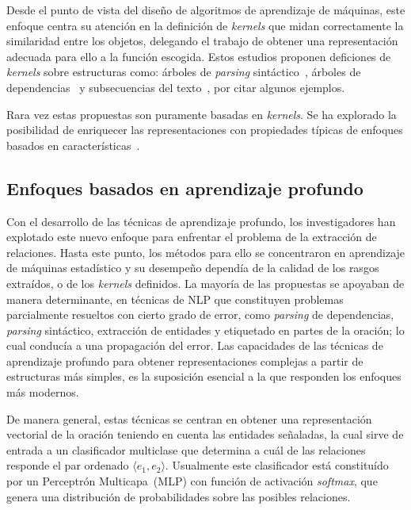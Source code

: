 Desde el punto de vista del diseño de algoritmos de aprendizaje de máquinas, este enfoque centra su atención en la definición de \textit{kernels} que midan correctamente la similaridad entre los objetos, delegando el trabajo de obtener una representación adecuada para ello a la función escogida.
Estos estudios proponen deficiones de \textit{kernels} sobre estructuras como: árboles de \textit{parsing} sintáctico~\cite{zelenko2003kernel, zhao2005extracting, zhang2006composite, zhou2007tree}, árboles de dependencias~\cite{culotta2004dependency, bunescu2005shortest, zhao2005extracting} y subsecuencias del texto~\cite{zhao2005extracting, mooney2006subsequence}, por citar algunos ejemplos.

Rara vez estas propuestas son puramente basadas en \textit{kernels}.
Se ha explorado la posibilidad de enriquecer las representaciones con propiedades típicas de enfoques basados en características~\cite{culotta2004dependency, bunescu2005shortest, zhang2006composite, zhao2005extracting}.

\subsection{Enfoques basados en aprendizaje profundo}

Con el desarrollo de las técnicas de aprendizaje profundo, los investigadores han explotado este nuevo enfoque para enfrentar el problema de la extracción de relaciones.
Hasta este punto, los métodos para ello se concentraron en aprendizaje de máquinas estadístico y su desempeño dependía de la calidad de los rasgos extraídos, o de los \textit{kernels} definidos.
La mayoría de las propuestas se apoyaban de manera determinante, en técnicas de NLP que constituyen problemas parcialmente resueltos con cierto grado de error, como \textit{parsing} de dependencias, \textit{parsing} sintáctico, extracción de entidades y etiquetado en partes de la oración; lo cual conducía a una propagación del error.
Las capacidades de las técnicas de aprendizaje profundo para obtener representaciones complejas a partir de estructuras más simples, es la suposición esencial a la que responden los enfoques más modernos.

De manera general, estas técnicas se centran en obtener una representación vectorial de la oración teniendo en cuenta las entidades señaladas, la cual sirve de entrada a un clasificador multiclase que determina a cuál de las relaciones responde el par ordenado $\langle e_1,e_2\rangle$.
Usualmente este clasificador está constituído por un Perceptrón Multicapa~(MLP) con función de activación \textit{softmax}, que genera una distribución de probabilidades sobre las posibles relaciones.

